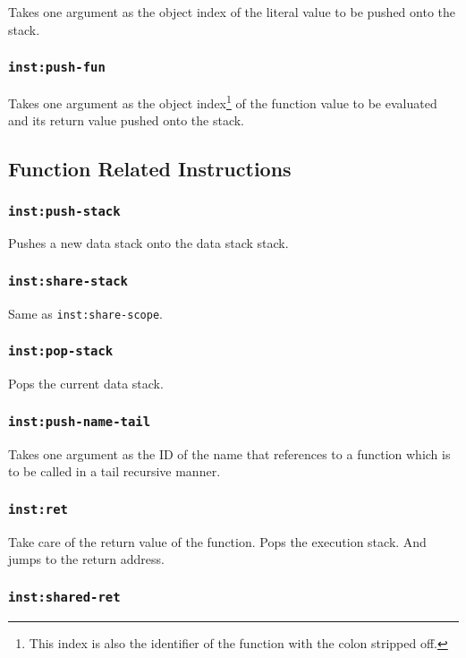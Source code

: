 \documentclass{article}
\newcommand{\inst}[1] {\texttt{inst:#1}}
\begin{document}
Takes one argument as the object index of the literal value to be pushed onto the stack.

\subsubsection{\inst{push-fun}}

Takes one argument as the object index\footnote{This index is also the identifier of the function with the colon stripped off.} of the function value to be evaluated and its return value pushed onto the stack.

\subsection{Function Related Instructions}

\subsubsection{\inst{push-stack}}

Pushes a new data stack onto the data stack stack.

\subsubsection{\inst{share-stack}}

Same as \inst{share-scope}.

\subsubsection{\inst{pop-stack}}

Pops the current data stack.

\subsubsection{\inst{push-name-tail}}

Takes one argument as the ID of the name that references to a function which is to be called in a tail recursive manner.

\subsubsection{\inst{ret}}

Take care of the return value of the function. Pops the execution stack. And jumps to the return address.

\subsubsection{\inst{shared-ret}}
\end{document}
